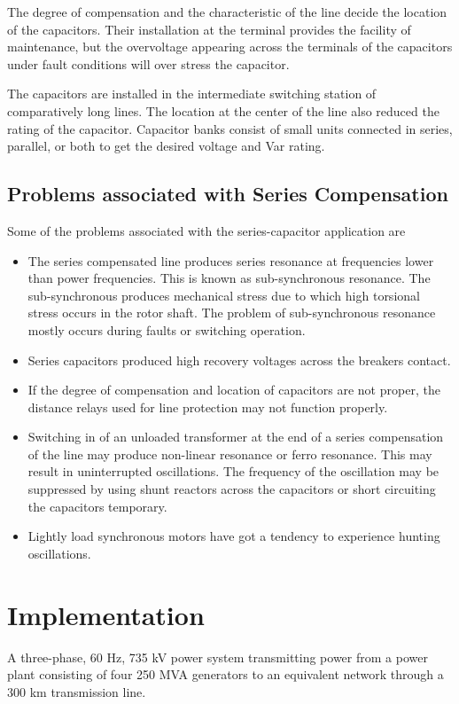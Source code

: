 \documentclass[12pt]{article}
\begin{document}
    The degree of compensation and the characteristic of the line decide the location of the 
    capacitors. Their installation at the terminal provides the facility of maintenance, but 
    the overvoltage appearing across the terminals of the capacitors under fault conditions will 
    over stress the capacitor.

    The capacitors are installed in the intermediate switching station of comparatively long lines. 
    The location at the center of the line also reduced the rating of the capacitor. 
    Capacitor banks consist of small units connected in series, parallel, or both to get 
    the desired voltage and Var rating.

    \subsection{Problems associated with Series Compensation}
    Some of the problems associated with the series-capacitor application are

    \begin{itemize}
      \item The series compensated line produces series resonance at frequencies lower than power 
      frequencies. This is known as sub-synchronous resonance. The sub-synchronous produces 
      mechanical stress due to which high torsional stress occurs in the rotor shaft. The problem 
      of sub-synchronous resonance mostly occurs during faults or switching operation. 
      
      \item Series capacitors produced high recovery voltages across the breakers contact.
      \item If the degree of compensation and location of capacitors are not proper, the distance 
      relays used for line protection may not function properly.
      \item Switching in of an unloaded transformer at the end of a series compensation of the line 
      may produce non-linear resonance or ferro resonance. This may result in uninterrupted oscillations.
      The frequency of the oscillation may be suppressed by using shunt reactors across the capacitors 
      or short circuiting the capacitors temporary.
      \item Lightly load synchronous motors have got a tendency to experience hunting oscillations.
    \end{itemize}

  \pagebreak
  \section{Implementation}
  A three-phase, 60 Hz, 735 kV power system transmitting power from a power plant consisting of 
  four 250 MVA generators to an equivalent network through a 300 km transmission line. 
  
\end{document}
